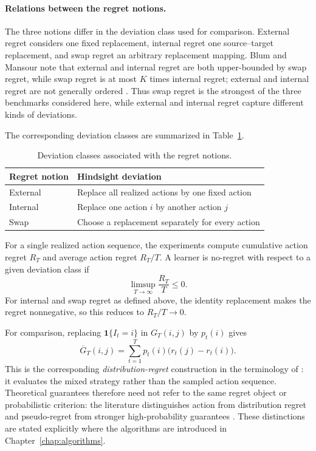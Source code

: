 \paragraph{Relations between the regret notions.}
The three notions differ in the deviation class used for comparison.
External regret considers one fixed replacement, internal regret one
source--target replacement, and swap regret an arbitrary replacement mapping.
Blum and Mansour note that external and internal regret are both
upper-bounded by swap regret, while swap regret is at most \(K\) times
internal regret; external and internal regret are not generally ordered
\citep{blum_external_2007}. Thus swap regret is the strongest of the three
benchmarks considered here, while external and internal regret capture
different kinds of deviations.

The corresponding deviation classes are summarized in
Table~\ref{tab:regret-deviations}.

\begin{table}[ht]
    \centering
    \caption{Deviation classes associated with the regret notions.}
    \label{tab:regret-deviations}
    \begin{tabular}{ll}
        \toprule
        Regret notion & Hindsight deviation \\
        \midrule
        External
        & Replace all realized actions by one fixed action \\
        Internal
        & Replace one action \(i\) by another action \(j\) \\
        Swap
        & Choose a replacement separately for every action \\
        \bottomrule
    \end{tabular}
\end{table}

For a single realized action sequence, the experiments compute cumulative
action regret \(R_T\) and average action regret \(R_T/T\). A learner is
no-regret with respect to a given deviation class if
\[
    \limsup_{T\rightarrow\infty}\frac{R_T}{T}\leq 0.
\]
For internal and swap regret as defined above, the identity replacement makes
the regret nonnegative, so this reduces to \(R_T/T\rightarrow0\).

For comparison, replacing
\(\mathbf{1}\{I_t=i\}\) in \(G_T(i,j)\) by \(p_t(i)\) gives
\[
    \overline{G}_T(i,j)
    =
    \sum_{t=1}^{T}
    p_t(i)\bigl(r_t(j)-r_t(i)\bigr).
\]
This is the corresponding \emph{distribution-regret} construction in the
terminology of \citet{greenwald_bounds_2006}: it evaluates the mixed strategy
rather than the sampled action sequence. Theoretical guarantees therefore need
not refer to the same regret object or probabilistic criterion: the literature
distinguishes action from distribution regret \citep{greenwald_bounds_2006}
and pseudo-regret from stronger high-probability guarantees
\citep{huang_near-optimal_2023}. These distinctions are stated explicitly
where the algorithms are introduced in Chapter~\ref{chap:algorithms}.

